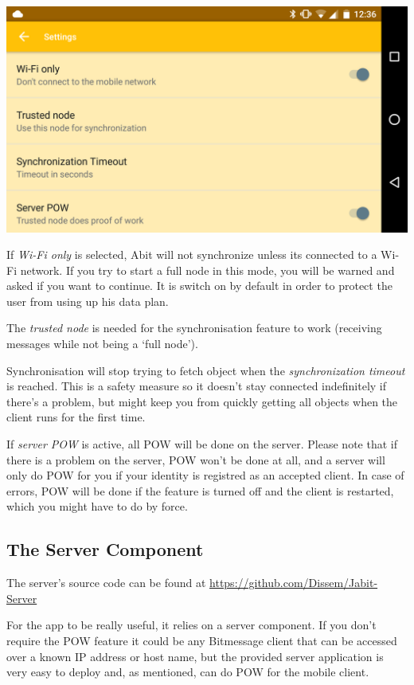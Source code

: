 \documentclass{bfh}
\begin{document}
  \begin{center}
    \includegraphics[width=0.8 \textwidth]{images/screenshot_settings.png}
  \end{center}

  If \textit{Wi-Fi only} is selected, Abit will not synchronize unless its connected to a Wi-Fi network. If you try to start a full node in this mode, you will be warned and asked if you want to continue. It is switch on by default in order to protect the user from using up his data plan.

  The \textit{trusted node} is needed for the synchronisation feature to work (receiving messages while not being a `full node').

  Synchronisation will stop trying to fetch object when the \textit{synchronization timeout} is reached. This is a safety measure so it doesn't stay connected indefinitely if there's a problem, but might keep you from quickly getting all objects when the client runs for the first time.

  If \textit{server POW} is active, all \ac{POW} will be done on the server. Please note that if there is a problem on the server, \ac{POW} won't be done at all, and a server will only do \ac{POW} for you if your identity is registred as an accepted client. In case of errors, \ac{POW} will be done if the feature is turned off and the client is restarted, which you might have to do by force.


  \subsection{The Server Component}
  The server's source code can be found at \url{https://github.com/Dissem/Jabit-Server}

  For the app to be really useful, it relies on a server component. If you don't require the \ac{POW} feature it could be any Bitmessage client that can be accessed over a known \acs{IP} address or host name, but the provided server application is very easy to deploy and, as mentioned, can do \ac{POW} for the mobile client.
\end{document}
